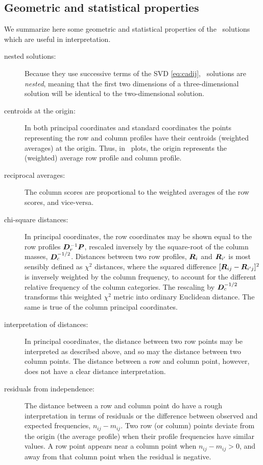 \subsection{Geometric and statistical properties}\label{sec:ca-properties}
We summarize here some geometric and statistical properties of the
\CA\ solutions which are useful in interpretation.

\begin{description}
\item[nested solutions:] Because they use successive terms of the SVD
  \eqref{eq:cadij}, \CA\ solutions are \emph{nested}, meaning that the first
  two dimensions of a three-dimensional solution will be identical
  to the two-dimensional solution.

\item[centroids at the origin:] In both principal coordinates and standard
coordinates the points representing the row and column profiles have their
centroids (weighted averages) at the origin.
Thus, in \CA\ plots, the origin represents the (weighted) average
row profile and column profile.

\item[reciprocal averages:]
The column scores are proportional to the weighted averages of the row
scores, and vice-versa.

\item[chi-square distances:]  In principal coordinates, the row coordinates
may be shown equal to the row profiles $\bm{D}_r^{-1} \bm{P}$, rescaled inversely by the square-root of the column masses, $\bm{D}_c^{-1/2}$.
Distances between two row profiles, $\bm{R}_i$ and $\bm{R}_{i^\prime}$
is most sensibly defined as $\chi^2$ distances, where the squared
difference $[\bm{R}_{ij} -\bm{R}_{i^\prime j}]^2$ is inversely weighted
by the column frequency, to account for the different relative
frequency of the column categories.
The rescaling by $\bm{D}_c^{-1/2}$ transforms this weighted $\chi^2$
metric into ordinary Euclidean distance.
The same is true of the column principal coordinates.

\item[interpretation of distances:]
In principal coordinates,
the distance between two row points may be interpreted as described
above, and so may the distance between two column points.
The distance between a row and column point, however, does not have
a clear distance interpretation.

\item[residuals from independence:]
The distance between a row and column point do have a rough
interpretation in terms of residuals or the difference between
observed and expected frequencies, $n_{ij} - m_{ij}$.
Two row (or column) points deviate from the origin (the average
profile) when their profile frequencies have similar values.
A row point appears near a column point when  $n_{ij} - m_{ij} >
0$, and away from that column point when the residual is negative.
\end{description}

